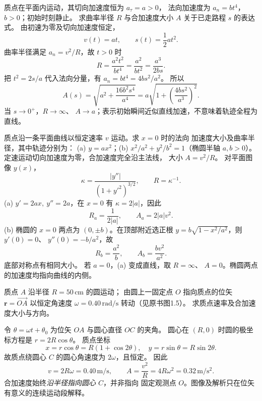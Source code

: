 
质点在平面内运动，其切向加速度恒为 $a_\tau=a>0$，
法向加速度为 $a_n=bt^4$，$b>0$；初始时刻静止。
求曲率半径 $R$ 与合加速度大小 $A$ 关于已走路程 $s$ 的表达式。
\exsolution
由初速为零及切向加速度恒定，
\[
 v(t)=at,\qquad s(t)=\frac12at^2.
\]
曲率半径满足 $a_n=v^2/R$，故 $t>0$ 时
\[
 R=\frac{a^2t^2}{bt^4}=\frac{a^2}{bt^2}
 =\boxed{\frac{a^3}{2bs}}.
\]
把 $t^2=2s/a$ 代入法向分量，有
$a_n=bt^4=4bs^2/a^2$。
所以
\[
 \boxed{A(s)=\sqrt{a^2+\frac{16b^2s^4}{a^4}}
 =a\sqrt{1+\left(\frac{4bs^2}{a^3}\right)^2}.}
\]
\excheck 当 $s\to0^+$，$R\to\infty$、
$A\to a$；表示初始瞬间近似直线加速，不意味着轨迹全程为直线。

质点沿一条平面曲线以恒定速率 $v$ 运动。求 $x=0$ 时的法向
加速度大小及曲率半径，其中轨迹分别为：
(a) $y=ax^2$；(b) $x^2/a^2+y^2/b^2=1$（椭圆半轴 $a,b>0$）。
\exsolution
定速运动切向加速度为零，合加速度完全沿主法线，
大小 $A=v^2/R$。
对平面图像 $y(x)$，
\[
 \kappa=\frac{|y''|}{(1+y'^2)^{3/2}},\qquad R=\kappa^{-1}.
\]
(a) $y'=2ax,\ y''=2a$，在 $x=0$ 有 $\kappa=2|a|$，因此
\[
 \boxed{R_a=\frac1{2|a|},\qquad A_a=2|a|v^2.}
\]
(b) 椭圆的 $x=0$ 两点为 $(0,\pm b)$。在顶部附近选正根
$y=b\sqrt{1-x^2/a^2}$，则 $y'(0)=0$、
$y''(0)=-b/a^2$，故
\[
 \boxed{R_b=\frac{a^2}{b},\qquad A_b=\frac{bv^2}{a^2}.}
\]
底部对称点有相同大小。
\excheck 若 $a=0$，(a) 变成直线，取 $R=\infty$、
$A=0$。椭圆两点的加速度均指向曲线的内侧。

质点 $A$ 沿半径 $R=50\,\mathrm{cm}$ 的圆运动；
由圆上一固定点 $O$ 指向质点的位矢 $\bm r=\overrightarrow{OA}$
以恒定角速度 $\omega=0.40\,\mathrm{rad/s}$ 转动（见原书图1.5）。
求质点速率及合加速度大小与方向。
\begin{center}
\end{center}
\exsolution
令 $\theta=\omega t+\theta_0$ 为位矢 $OA$ 与圆心直径 $OC$ 的夹角。
圆心在 $(R,0)$ 时圆的极坐标方程是 $r=2R\cos\theta$。
质点坐标
\[
 x=r\cos\theta=R(1+\cos2\theta),\quad
 y=r\sin\theta=R\sin2\theta.
\]
故质点绕圆心 $C$ 的圆心角速度为 $2\omega$，且恒定。
因此
\[
 \boxed{v=2R\omega=0.40\,\mathrm{m/s}},\qquad
 \boxed{A=\frac{v^2}{R}=4R\omega^2
 =0.32\,\mathrm{m/s^2}}.
\]
\excheck 合加速度始终\emph{沿半径指向圆心 $C$}，并非指向
固定观测点 $O$。图像及解析只在位矢有意义的连续运动段解释。

